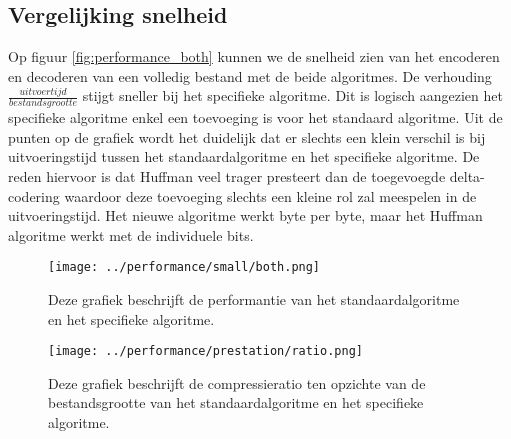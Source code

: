 \documentclass[11pt, a4paper]{article}
\begin{document}
\subsection{Vergelijking snelheid}
Op figuur \ref{fig:performance_both} kunnen we de snelheid zien van het encoderen en decoderen van een volledig bestand met de beide algoritmes. De verhouding $\frac{uitvoertijd}{bestandsgrootte}$ stijgt sneller bij het specifieke algoritme. Dit is logisch aangezien het specifieke algoritme enkel een toevoeging is voor het standaard algoritme.  Uit de punten op de grafiek wordt het duidelijk dat er slechts een klein verschil is bij uitvoeringstijd tussen het standaardalgoritme en het specifieke algoritme. De reden hiervoor is dat Huffman veel trager presteert dan de toegevoegde delta-codering waardoor deze toevoeging slechts een kleine rol zal meespelen in de uitvoeringstijd. Het nieuwe algoritme werkt byte per byte, maar het Huffman algoritme werkt met de individuele bits. 
\begin{figure}
	\begin{center}
		\texttt{[image: ../performance/small/both.png]}
	\end{center}
	\caption{Deze grafiek beschrijft de performantie van het standaardalgoritme en het specifieke algoritme.}
	\label{fig:performance_both}
	\begin{center}
		\texttt{[image: ../performance/prestation/ratio.png]}
	\end{center}
	\caption{Deze grafiek beschrijft de compressieratio ten opzichte van de bestandsgrootte van het standaardalgoritme en het specifieke algoritme.}
	\label{fig:prestation}
\end{figure}
\end{document}
